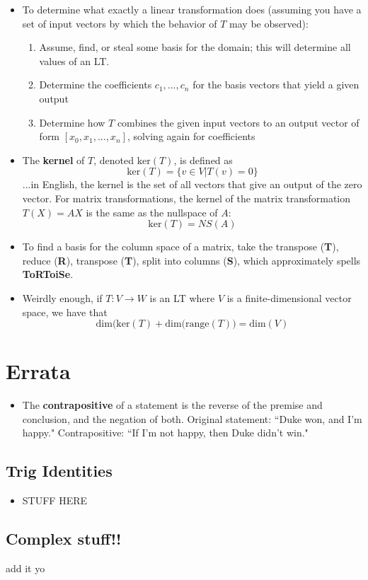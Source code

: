 \documentclass[10pt,letterpaper]{article}
\begin{document}
\begin{itemize}
\item To determine what exactly a linear transformation does (assuming you have a set of input vectors by which the behavior of $T$ may be observed): 
\begin{enumerate} 
\item Assume, find, or steal some basis for the domain; this will determine all values of an LT. 
\item Determine the coefficients $c_1, ...,c_n$ for the basis vectors that yield a given output 
\item Determine how $T$ combines the given input vectors to an output vector of form  $[x_0,x_1,...,x_n]$, solving again for coefficients
\end{enumerate}

\item The \textbf{kernel} of $T$, denoted $\mbox{ker}(T)$, is defined as 
$$\mbox{ker}(T)=\{ v\in V | T(v)=0\}$$ 
...in English, the kernel is the set of all vectors that give an output of the zero vector. For matrix transformations, the kernel of the matrix transformation $T(X)=AX$ is the same as the nullspace of $A$: 
$$\mbox{ker}(T)=NS(A)$$ %

\item To find a basis for the column space of a matrix, take the transpose (\textbf{T}), reduce (\textbf{R}), transpose (\textbf{T}), split into columns (\textbf{S}), which approximately spells \textbf{ToRToiSe}.

\item Weirdly enough, if $T : V \to W$ is an LT where $V$ is a finite-dimensional vector space, we have that 
$$\mbox{dim(ker}(T)+\mbox{dim(range}(T)) = \mbox{dim}(V)$$

\end{itemize}




\section*{Errata} 

\begin{itemize}
\item The \textbf{contrapositive }of a statement is the reverse of the premise and conclusion, and the negation of both. Original statement: ``Duke won, and I'm happy." Contrapositive: ``If I'm not happy, then Duke didn't win."
\end{itemize}

\subsection*{Trig Identities}
\begin{itemize}
\item STUFF HERE 
\end{itemize}

\subsection*{Complex stuff!! }
add it yo 


\iffalse 
#### sources 
* http://inside.mines.edu/fs_home/gmurray/teach/s02/trialSoln.pdf

\fi 
\end{document}
